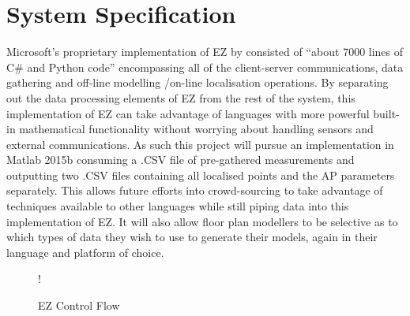 \documentclass{UoYCSproject}
\begin{document}
		\section{System Specification}
        \label{sec:sysspec}
            
            Microsoft's proprietary implementation of EZ by \citeauthor{chintalapudi2010indoor} consisted of ``about 7000 lines of C\# and Python code'' encompassing all of the client-server communications, data gathering and off-line modelling /on-line localisation operations. By separating out the data processing elements of EZ from the rest of the system, this implementation of EZ can take advantage of languages with more powerful built-in mathematical functionality without worrying about handling sensors and external communications. As such this project will pursue an implementation in Matlab 2015b consuming a .CSV file of pre-gathered measurements and outputting two .CSV files containing all localised points and the AP parameters separately. This allows future efforts into crowd-sourcing to take advantage of techniques available to other languages while still piping data into this implementation of EZ. It will also allow floor plan modellers to be selective as to which types of data they wish to use to generate their models, again in their language and platform of choice.
            
            \begin{figure}[h]
            \label{fig:EZControl}
            \centering
            \resizebox {\textwidth} {!} {
	        }
            \caption{EZ Control Flow}
	        \end{figure}
            
\end{document}
